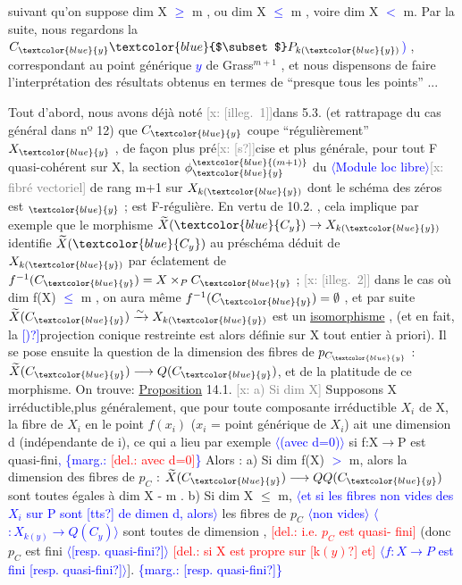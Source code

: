 \documentclass[11pt]{article}
\newcommand{\hand}[1]{\textcolor{blue}{#1}}
\let\over\relax
\newcommand{\over}[2]{\textcolor{gray}{#1}\textcolor{blue}{\ensuremath{^{\!\nearrow}}#2}}
\newcommand{\inserted}[2][]{\textcolor{blue}{$\langle$#2$\rangle$}}
\newcommand{\margin}[1]{\textcolor{blue}{\{\textsf{marg.:} #1\}}}
\newcommand{\deleted}[1]{\textcolor{red}{[\textsf{del.:} #1]}}
\newcommand{\xout}[1]{\textcolor{gray}{[\textsf{x:} #1]}}
\newcommand{\uline}[1]{\underline{#1}}
\newcommand{\unsure}[1]{[#1?]}
\newcommand{\illegible}[1]{[\textsf{illeg.\ #1}]}
\begin{document}
suivant qu'on suppose  dim X \hand{$\geqslant$} m , ou  dim X \hand{$\leqslant$} m , voire dim X \hand{$<$} m.
Par la suite, nous regardons la $C_{\hand{y}}\hand{$\subset$} P_{k(\hand{y})}$\hand{)} , correspondant au point
générique \hand{$y$} de  Grass$^{m+1}$ , et nous dispensons  de faire l'interprétation
des résultats obtenus en termes de  ``presque tous les points'' ...

Tout d'abord, nous avons déjà noté \xout{\illegible{1}}dans 5.3. (et rattrapage du
cas général dans nº 12)  que $C_{\hand{y}}$  coupe ``régulièrement'' $X_{\hand{y}}$ , de façon
plus pré\xout{\unsure{s}}cise et plus générale, pour tout F quasi-cohérent sur X,
la section $\phi_{\hand{y}}^{\hand{(m+1)}}$ du \inserted[typed]{Module loc libre}\xout{fibré vectoriel} de rang  m+1  sur  $X_{k(\hand{y})}$  dont le
schéma des zéros est \over{C}{$C$}$_{\hand{y}}$ ; est F-régulière. En vertu de 10.2. , cela
implique par exemple que le morphisme  $\widetilde{X}(\hand{C_y})\to X_{k(\hand{y})}$ identifie $\widetilde{X}(\hand{C_y})$ au préschéma
déduit de $X_{k(\hand{y})}$ par éclatement de $f^{-1}(C_{\hand{y}})= X\times_P C_{\hand{y}}$ ;  \xout{\illegible{2}} dans le cas
où  dim f(X) \hand{$\leqslant$} m ,  on  aura même  $f^{-1}(C_{\hand{y}}) = \emptyset$ , et  par suite
$\widetilde{X}(C_{\hand{y}}) \xrightarrow{\sim} X_{k(\hand{y})}$  est un \uline{isomorphisme} , (et en fait, la \hand{\unsure{)}}projection conique
restreinte  est alors définie sur X tout entier à priori). Il se pose
ensuite la question de la dimension des fibres de $p_{C_{\hand{y}}}$ : $\widetilde{X}(C_{\hand{y}}) \longrightarrow Q(C_{\hand{y}})$,
et de la platitude de ce morphisme. On trouve:
\uline{Proposition} 14.1.  \xout{a) Si dim X} Supposons X irréductible,\over{\unsure{e}}{\unsure{ou}}plus
généralement, que  pour toute composante irréductible $X_i$ de X, la fibre
de $X_i$ en le point $f(x_i)$  ($x_i$ = point générique de $X_i$) ait une dimension d
(indépendante de i), ce qui a lieu par exemple \inserted{(avec d=0)} si f:X$\to$P est quasi-fini\hand{,} \margin{\deleted{avec d=0}}
Alors :     a)  Si  dim f(X) \hand{$>$} m, alors la dimension  des fibres de
$p_C$  : $\widetilde{X}(C_{\hand{y}}) \longrightarrow \over{Q}{Q}(C_{\hand{y}})$  sont toutes égales à  dim X - m .   b)  Si dim X
$\leqslant$ m, \inserted{et si les fibres non vides des $X_i$ sur P sont \unsure{tts} de dimen d, alors} les fibres de $p_C$ \inserted{non vides} \inserted{$\colon X_{k(y)}\to Q(C_y)$} sont toutes de dimension \over{0}{d}, \deleted{i.e. $p_C$ est quasi-%
fini} (donc $p_C$ est fini \inserted{\unsure{resp. quasi-fini}} \deleted{si X est propre sur \unsure{k$(y)$} et} \inserted{$f\colon X\to P$ est fini \unsure{resp. quasi-fini}}].
\margin{\unsure{resp. quasi-fini}}
\end{document}
